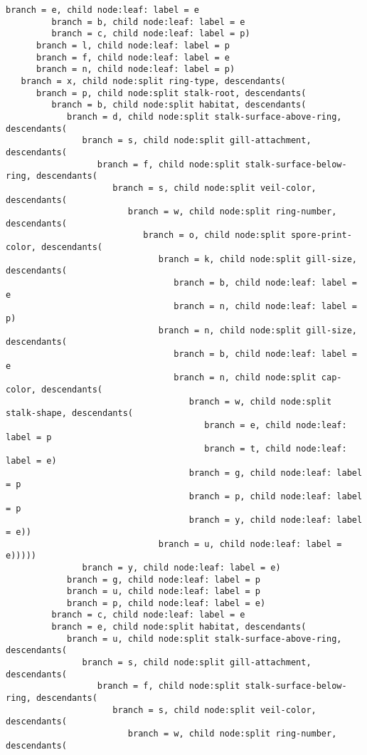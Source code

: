 \documentclass[11pt]{article}
\begin{document}
\begin{Verbatim}[commandchars=\\\{\}]
         branch = e, child node:leaf: label = e
         branch = b, child node:leaf: label = e
         branch = c, child node:leaf: label = p)
      branch = l, child node:leaf: label = p
      branch = f, child node:leaf: label = e
      branch = n, child node:leaf: label = p)
   branch = x, child node:split ring-type, descendants(
      branch = p, child node:split stalk-root, descendants(
         branch = b, child node:split habitat, descendants(
            branch = d, child node:split stalk-surface-above-ring, descendants(
               branch = s, child node:split gill-attachment, descendants(
                  branch = f, child node:split stalk-surface-below-ring, descendants(
                     branch = s, child node:split veil-color, descendants(
                        branch = w, child node:split ring-number, descendants(
                           branch = o, child node:split spore-print-color, descendants(
                              branch = k, child node:split gill-size, descendants(
                                 branch = b, child node:leaf: label = e
                                 branch = n, child node:leaf: label = p)
                              branch = n, child node:split gill-size, descendants(
                                 branch = b, child node:leaf: label = e
                                 branch = n, child node:split cap-color, descendants(
                                    branch = w, child node:split stalk-shape, descendants(
                                       branch = e, child node:leaf: label = p
                                       branch = t, child node:leaf: label = e)
                                    branch = g, child node:leaf: label = p
                                    branch = p, child node:leaf: label = p
                                    branch = y, child node:leaf: label = e))
                              branch = u, child node:leaf: label = e)))))
               branch = y, child node:leaf: label = e)
            branch = g, child node:leaf: label = p
            branch = u, child node:leaf: label = p
            branch = p, child node:leaf: label = e)
         branch = c, child node:leaf: label = e
         branch = e, child node:split habitat, descendants(
            branch = u, child node:split stalk-surface-above-ring, descendants(
               branch = s, child node:split gill-attachment, descendants(
                  branch = f, child node:split stalk-surface-below-ring, descendants(
                     branch = s, child node:split veil-color, descendants(
                        branch = w, child node:split ring-number, descendants(

\end{Verbatim}
\end{document}
